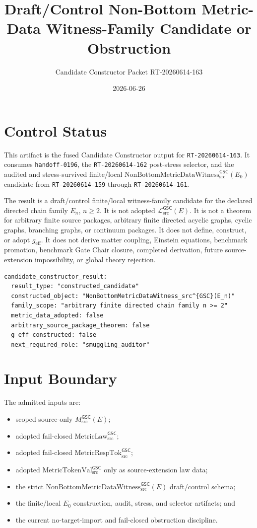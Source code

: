 \documentclass[11pt]{article}
\title{Draft/Control Non-Bottom Metric-Data Witness-Family Candidate or Obstruction}
\author{Candidate Constructor Packet RT-20260614-163}
\date{2026-06-26}
\newcommand{\MsrcGSC}{M_{\mathrm{src}}^{\mathsf{GSC}}}
\newcommand{\MetricLaw}{\mathrm{MetricLaw}_{\mathrm{src}}^{\mathsf{GSC}}}
\newcommand{\MetricRespTok}{\mathrm{MetricRespTok}_{\mathrm{src}}^{\mathsf{GSC}}}
\newcommand{\MetricTokenVal}{\mathrm{MetricTokenVal}_{\mathrm{src}}^{\mathsf{GSC}}}
\newcommand{\Witness}{\mathrm{NonBottomMetricDataWitness}_{\mathrm{src}}^{\mathsf{GSC}}}
\newcommand{\MetricData}{\mathcal{L}_{\mathrm{src}}^{\mathsf{GSC}}}
\newcommand{\geff}{g_{\mathrm{eff}}}
\newcommand{\En}{E_n}
\begin{document}
\maketitle

\section{Control Status}

This artifact is the fused Candidate Constructor output for
\texttt{RT-20260614-163}. It consumes \texttt{handoff-0196}, the
\texttt{RT-20260614-162} post-stress selector, and the audited and
stress-survived finite/local \(\Witness(E_0)\) candidate from
\texttt{RT-20260614-159} through \texttt{RT-20260614-161}.

The result is a draft/control finite/local witness-family candidate for the
declared directed chain family \(\En\), \(n\ge 2\). It is not adopted
\(\MetricData(E)\). It is not a theorem for arbitrary finite source packages,
arbitrary finite directed acyclic graphs, cyclic graphs, branching graphs, or
continuum packages. It does not define, construct, or adopt \(\geff\). It does
not derive matter coupling, Einstein equations, benchmark promotion,
benchmark Gate Chair closure, completed derivation, future source-extension
impossibility, or global theory rejection.

\begin{verbatim}
candidate_constructor_result:
  result_type: "constructed_candidate"
  constructed_object: "NonBottomMetricDataWitness_src^{GSC}(E_n)"
  family_scope: "arbitrary finite directed chain family n >= 2"
  metric_data_adopted: false
  arbitrary_source_package_theorem: false
  g_eff_constructed: false
  next_required_role: "smuggling_auditor"
\end{verbatim}

\section{Input Boundary}

The admitted inputs are:
\begin{itemize}[leftmargin=*]
  \item scoped source-only \(\MsrcGSC(E)\);
  \item adopted fail-closed \(\MetricLaw\);
  \item adopted fail-closed \(\MetricRespTok\);
  \item adopted \(\MetricTokenVal\) only as source-extension law data;
  \item the strict \(\Witness(E)\) draft/control schema;
  \item the finite/local \(E_0\) construction, audit, stress, and selector
  artifacts; and
  \item the current no-target-import and fail-closed obstruction discipline.
\end{itemize}
\end{document}
